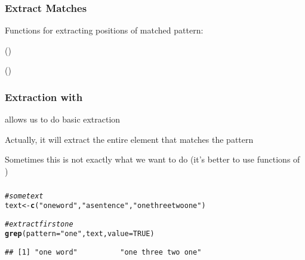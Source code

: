 \documentclass[12pt]{beamer}\usepackage[]{graphicx}\usepackage[]{color}
\makeatletter
\newcommand{\hlnum}[1]{\textcolor[rgb]{0.686,0.059,0.569}{#1}}%
\newcommand{\hlstr}[1]{\textcolor[rgb]{0.192,0.494,0.8}{#1}}%
\newcommand{\hlcom}[1]{\textcolor[rgb]{0.678,0.584,0.686}{\textit{#1}}}%
\newcommand{\hlstd}[1]{\textcolor[rgb]{0.345,0.345,0.345}{#1}}%
\newcommand{\hlkwb}[1]{\textcolor[rgb]{0.69,0.353,0.396}{#1}}%
\newcommand{\hlkwc}[1]{\textcolor[rgb]{0.333,0.667,0.333}{#1}}%
\newcommand{\hlkwd}[1]{\textcolor[rgb]{0.737,0.353,0.396}{\textbf{#1}}}%
\newenvironment{kframe}{%
 \def\at@end@of@kframe{}%
 \ifinner\ifhmode%
  \def\at@end@of@kframe{\end{minipage}}%
  \begin{minipage}{\columnwidth}%
 \fi\fi%
 \def\FrameCommand##1{\hskip\@totalleftmargin \hskip-\fboxsep
 \colorbox{shadecolor}{##1}\hskip-\fboxsep
     \hskip-\linewidth \hskip-\@totalleftmargin \hskip\columnwidth}%
 \MakeFramed {\advance\hsize-\width
   \@totalleftmargin\z@ \linewidth\hsize
   \@setminipage}}%
 {\par\unskip\endMakeFramed%
 \at@end@of@kframe}
\newenvironment{knitrout}{}{} %
\makeatother
\begin{document}

\begin{frame}
\begin{center}
\Huge{}
\end{center}
\end{frame}


\begin{frame}
\frametitle{Extract Matches}

Functions for extracting positions of matched pattern: 
\bbi
  \item {}
  \item {} ()
  \item {} ()
\ei

\end{frame}


\begin{frame}[fragile]
\frametitle{Extraction with }

\bi
  \item {\hilit {}} allows us to do basic extraction
  \item Actually, it will extract the entire element that matches the pattern
  \item Sometimes this is not exactly what we want to do (it's better to use functions of )
\ei

\end{frame}


\begin{frame}[fragile]
\frametitle{}

\begin{knitrout}\footnotesize
{}\color{fgcolor}\begin{kframe}
\begin{alltt}
\hlcom{# some text}
\hlstd{text} \hlkwb{<-} \hlkwd{c}\hlstd{(}\hlstr{"one word"}\hlstd{,} \hlstr{"a sentence"}\hlstd{,} \hlstr{"one three two one"}\hlstd{)}

\hlcom{# extract first one}
\hlkwd{grep}\hlstd{(}\hlkwc{pattern} \hlstd{=} \hlstr{"one"}\hlstd{, text,} \hlkwc{value} \hlstd{=} \hlnum{TRUE}\hlstd{)}
\end{alltt}
\begin{verbatim}
## [1] "one word"          "one three two one"
\end{verbatim}
\end{kframe}
\end{knitrout}

\end{frame}
\end{document}

